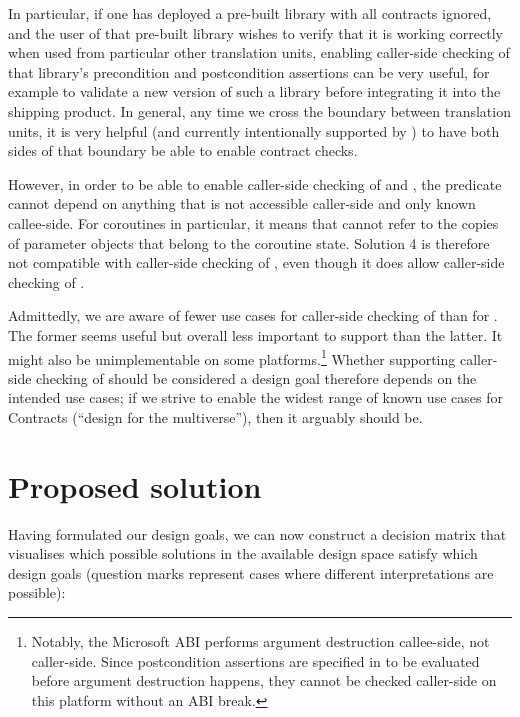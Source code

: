In particular, if one has deployed a pre-built library with all contracts ignored, and the user of that pre-built library wishes to verify that it is working correctly when used from particular other translation units, enabling caller-side checking of that library's precondition and postcondition assertions can be very useful, for example to validate a new version of such a library before integrating it into the shipping product. In general, any time we cross the boundary between translation units, it is very helpful (and currently intentionally supported by \cite{P2900R8}) to have both sides of that boundary be able to enable contract checks.

However, in order to be able to enable caller-side checking of  and , the predicate cannot depend on anything that is not accessible caller-side and only known callee-side. For coroutines in particular, it means that  cannot refer to the copies of parameter objects that belong to the coroutine state. Solution 4 is therefore not compatible with caller-side checking of , even though it does allow caller-side checking of .

Admittedly, we are aware of fewer use cases for caller-side checking of  than for . The former seems useful but overall less important to support than the latter. It might also be unimplementable on some platforms.\footnote{Notably, the Microsoft ABI performs argument destruction callee-side, not caller-side. Since postcondition assertions are specified in \cite{P2900R8} to be evaluated before argument destruction happens, they cannot be checked caller-side on this platform without an ABI break.} Whether supporting caller-side checking of  should be considered a design goal therefore depends on the intended use cases; if we strive to enable the widest range of known use cases for Contracts (``design for the multiverse''), then it arguably should be.

\section{Proposed solution}

Having formulated our design goals, we can now construct a decision matrix that visualises which possible solutions in the available design space satisfy which design goals (question marks represent cases where different interpretations are possible):


